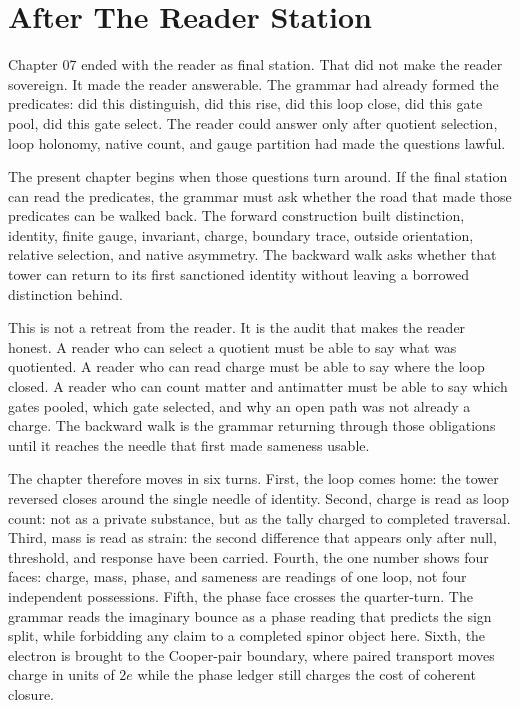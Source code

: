 \section{After The Reader Station}

Chapter 07 ended with the reader as final station. That did not make the
reader sovereign. It made the reader answerable. The grammar had already
formed the predicates: did this distinguish, did this rise, did this loop
close, did this gate pool, did this gate select. The reader could answer
only after quotient selection, loop holonomy, native count, and gauge
partition had made the questions lawful.

The present chapter begins when those questions turn around. If the final
station can read the predicates, the grammar must ask whether the road that
made those predicates can be walked back. The forward construction built
distinction, identity, finite gauge, invariant, charge, boundary trace,
outside orientation, relative selection, and native asymmetry. The backward
walk asks whether that tower can return to its first sanctioned identity
without leaving a borrowed distinction behind.

This is not a retreat from the reader. It is the audit that makes the reader
honest. A reader who can select a quotient must be able to say what was
quotiented. A reader who can read charge must be able to say where the loop
closed. A reader who can count matter and antimatter must be able to say
which gates pooled, which gate selected, and why an open path was not
already a charge. The backward walk is the grammar returning through those
obligations until it reaches the needle that first made sameness usable.

The chapter therefore moves in six turns. First, the loop comes home: the
tower reversed closes around the single needle of identity. Second, charge
is read as loop count: not as a private substance, but as the tally charged
to completed traversal. Third, mass is read as strain: the second difference
that appears only after null, threshold, and response have been carried.
Fourth, the one number shows four faces: charge, mass, phase, and sameness
are readings of one loop, not four independent possessions. Fifth, the phase
face crosses the quarter-turn. The grammar reads the imaginary bounce as a
phase reading that predicts the sign split, while forbidding any claim to a
completed spinor object here. Sixth, the electron is brought
to the Cooper-pair boundary, where paired transport moves charge in units of
\(2e\) while the phase ledger still charges the cost of coherent closure.

